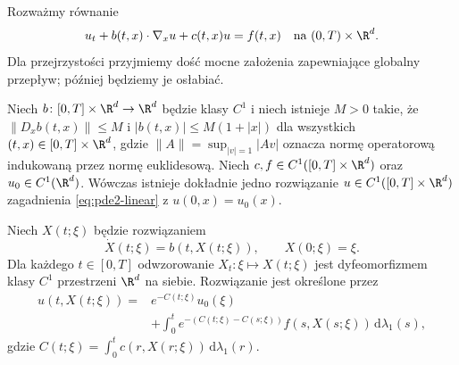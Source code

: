 Rozważmy równanie
\begin{equation}\label{eq:pde2-linear}
 u_t+b(t,x)\cdot\nabla_xu+c(t,x)u=f(t,x)
 \quad\text{na }(0,T)\times\R^d.
\end{equation}
Dla przejrzystości przyjmiemy dość mocne założenia
zapewniające globalny przepływ; później będziemy je osłabiać.

\begin{twierdzenie}
\label{thm:pde2-linear}
Niech $b\colon[0,T]\times\R^d\to\R^d$ będzie klasy $C^1$
i niech istnieje $M>0$ takie, że
$\|D_xb(t,x)\|\leq M$ i $|b(t,x)|\leq M(1+|x|)$
dla wszystkich $(t,x)\in[0,T]\times\R^d$, gdzie
$\|A\|=\sup_{|v|=1}|Av|$ oznacza normę operatorową
indukowaną przez normę euklidesową. Niech $c,f\in C^1([0,T]\times\R^d)$
oraz $u_0\in C^1(\R^d)$. Wówczas istnieje dokładnie jedno
rozwiązanie $u\in C^1([0,T]\times\R^d)$ zagadnienia
\eqref{eq:pde2-linear} z $u(0,x)=u_0(x)$.

Niech $X(t;\xi)$ będzie rozwiązaniem
\begin{equation}\label{eq:pde2-flow-ode}
 \dot X(t;\xi)=b(t,X(t;\xi)),\qquad X(0;\xi)=\xi.
\end{equation}
Dla każdego $t\in[0,T]$ odwzorowanie
$X_t\colon\xi\mapsto X(t;\xi)$ jest dyfeomorfizmem klasy $C^1$
przestrzeni $\R^d$ na siebie. Rozwiązanie jest określone przez
\begin{equation}\label{eq:pde2-solution}
 \begin{aligned}
 u(t,X(t;\xi))={}&e^{-C(t;\xi)}u_0(\xi)\\
 &+\int_0^t e^{-(C(t;\xi)-C(s;\xi))}
 f(s,X(s;\xi))\,\mathrm d\lambda_1(s),
 \end{aligned}
\end{equation}
gdzie $C(t;\xi)=\int_0^t c(r,X(r;\xi))\,\mathrm d\lambda_1(r)$.
\end{twierdzenie}
